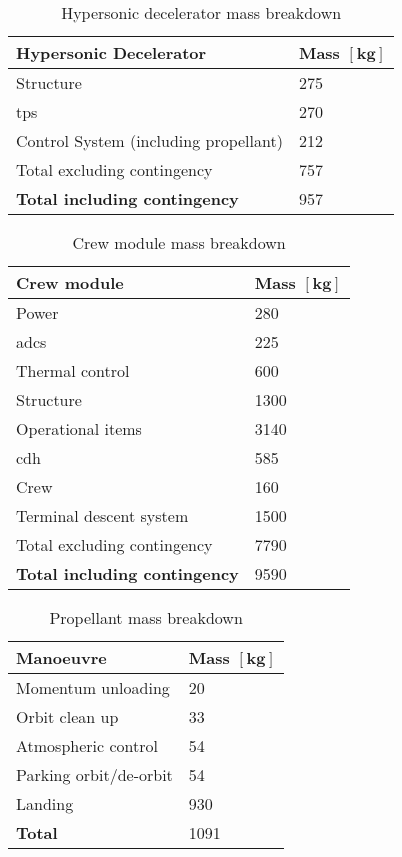 \begin{table}[ht]
	\centering
	\caption{Hypersonic decelerator mass breakdown}
	\label{tab:DeceleratorMass}
	\begin{tabular}{|l|l|} \hline
		\textbf {Hypersonic Decelerator}             & \textbf{Mass $\mathbf{[kg]}$ } \\ \hline \hline
		Structure          &		 275       \\ \hline
		\acrlong{tps} &		  270      \\ \hline
		Control System (including propellant) 		   &  212      \\ \hline \hline
		Total excluding contingency              	   &  757     \\ \hline
		\textbf {Total including contingency}                 &  957      \\ \hline
	\end{tabular}
\end{table}

\begin{table}[ht]
	\centering
	\caption{Crew module mass breakdown}
	\label{tab:CrewModuleMass}
	\begin{tabular}{|l|l|} \hline
		\textbf {Crew module}             & \textbf{Mass $\mathbf{[kg]}$ } \\ \hline \hline
		Power        &		 280       \\ \hline
		\gls{adcs} &		  225      \\ \hline
		Thermal control & 600\\ \hline
		Structure & 1300\\ \hline
		Operational items & 3140\\ \hline
		\acrlong{cdh} & 585 \\ \hline
		Crew & 160 \\ \hline
		Terminal descent system           		   &  1500      \\ \hline \hline
		Total excluding contingency              	   &  7790     \\ \hline
		\textbf {Total including contingency}                 &  9590      \\ \hline
	\end{tabular}
\end{table}

\begin{table}[ht]
	\centering
	\caption{Propellant mass breakdown}
	\label{tab:PropMass}
	\begin{tabular}{|l|l|} \hline
		\textbf {Manoeuvre}             & \textbf{Mass $\mathbf{[kg]}$ } \\ \hline \hline
		Momentum unloading       &		 20       \\ \hline
		Orbit clean up &		  33      \\ \hline
		Atmospheric control           		   &  54      \\ \hline 
		Parking orbit/de-orbit            	   & 54    \\ \hline
		Landing            	   &  930     \\ \hline \hline
		\textbf {Total}                 &  1091      \\ \hline
	\end{tabular}
\end{table}
